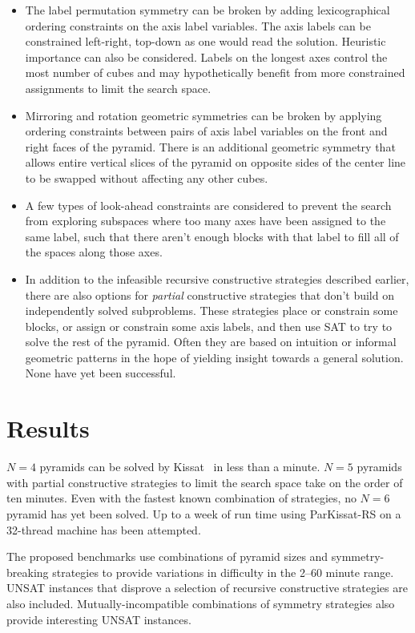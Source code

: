 \documentclass[conference]{IEEEtran}
\begin{document}
\begin{itemize}
\item The label permutation symmetry can be broken by adding lexicographical ordering constraints on the axis label variables.
The axis labels can be constrained left-right, top-down as one would read the solution.
Heuristic importance can also be considered.
Labels on the longest axes control the most number of cubes and may hypothetically benefit from more constrained assignments to limit the search space.
\item Mirroring and rotation geometric symmetries can be broken by applying ordering constraints between pairs of axis label
variables on the front and right faces of the pyramid.
There is an additional geometric symmetry that allows entire vertical slices of the pyramid on opposite sides of the center line to be
swapped without affecting any other cubes.
\item A few types of look-ahead constraints are considered to prevent the search from exploring subspaces where too many axes have been
assigned to the same label, such that there aren't enough blocks with that label to fill all of the spaces along those axes.
\item In addition to the infeasible recursive constructive strategies described earlier, there are also options for \emph{partial} constructive strategies
that don't build on independently solved subproblems.
These strategies place or constrain some blocks, or assign or constrain some axis labels, and then use SAT to try to solve the rest of the pyramid.
Often they are based on intuition or informal geometric patterns in the hope of yielding insight towards a general solution.
None have yet been successful.
\end{itemize}

\section{Results}

$N=4$ pyramids can be solved by Kissat~\cite{k1} in less than a minute.
$N=5$ pyramids with partial constructive strategies to limit the search space take on the order of ten minutes.
Even with the fastest known combination of strategies, no $N=6$ pyramid has yet been solved.
Up to a week of run time using ParKissat-RS on a 32-thread machine has been attempted.

The proposed benchmarks use combinations of pyramid sizes and symmetry-breaking strategies to provide variations in difficulty in the 2--60 minute range.
UNSAT instances that disprove a selection of recursive constructive strategies are also included.
Mutually-incompatible combinations of symmetry strategies also provide interesting UNSAT instances.
\end{document}
